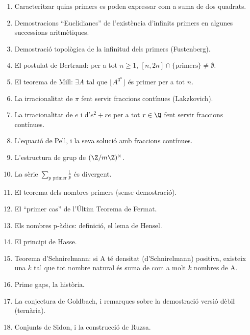 \begin{enumerate}
    \item Caracteritzar quins primers es poden expressar com a suma de dos quadrats.
    \item Demostracions ``Euclidianes'' de l'existència d'infinits primers en algunes successions aritmètiques.
    \item Demostració topològica de la infinitud dels primers (Fustenberg).
    \item El postulat de Bertrand: per a tot $n\geq 1$, $[n,2n]\cap \{\text{primers}\}\neq\emptyset$.
    \item El teorema de Mill: $\exists A$ tal que $\lfloor A^{3^n}\rfloor$ és primer per a tot $n$.
    \item La irracionalitat de $\pi$ fent servir fraccions contínues (Lakzkovich).
    \item La irracionalitat de $e$ i d'$e^2+re$ per a tot $r\in\Q$ fent servir fraccions contínues.
    \item L'equació de Pell, i la seva solució amb fraccions contínues.
    \item L'estructura de grup de $(\Z/m\Z)^\times$.
    \item La sèrie $\displaystyle\sum_{p\text{ primer}} \frac 1 p$ és divergent.
    \item El teorema dels nombres primers (sense demostració).
    \item El ``primer cas'' de l'Últim Teorema de Fermat.
    \item Els nombres p-àdics: definició, el lema de Hensel.
    \item El principi de Hasse.
    \item Teorema d'Schnirelmann: si A té densitat (d'Schnirelmann) positiva, existeix una $k$ tal que tot nombre natural és suma de com a molt $k$ nombres de A.
    \item Prime gaps, la història.
    \item La conjectura de Goldbach, i remarques sobre la demostració versió dèbil (ternària).
    \item Conjunts de Sidon, i la construcció de Ruzsa.
\end{enumerate}